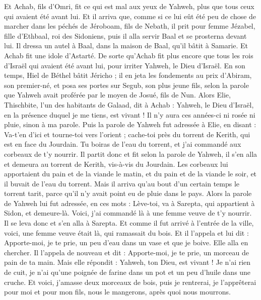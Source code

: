 \begin{multicols}{2}
Et Achab, fils d’Omri, fit ce qui est mal aux yeux de Yahweh, plus que tous ceux qui avaient été avant lui.
Et il arriva que, comme si ce lui eût été peu de chose de marcher dans les péchés de Jéroboam, fils de Nebath, il prit pour femme Jézabel, fille d'Ethbaal, roi des Sidoniens, puis il alla servir Baal et se prosterna devant lui.
Il dressa un autel à Baal, dans la maison de Baal, qu'il bâtit à Samarie.
Et Achab fit une idole d’Astarté. De sorte qu'Achab fit plus encore que tous les rois d'Israël qui avaient été avant lui, pour irriter Yahweh, le Dieu d'Israël.
En son temps, Hiel de Béthel bâtit Jéricho ; il en jeta les fondements au prix d’Abiram, son premier-né, et posa ses portes sur Segub, son plus jeune fils, selon la parole que Yahweh avait proférée par le moyen de Josué, fils de Nun.
\VerseOne{}Alors Elie, Thischbite, l’un des habitants de Galaad, dit à Achab : Yahweh, le Dieu d'Israël, en la présence duquel je me tiens, est vivant ! Il n'y aura ces années-ci ni rosée ni pluie, sinon à ma parole.
Puis la parole de Yahweh fut adressée à Elie, en disant :
Va-t'en d'ici et tourne-toi vers l'orient ; cache-toi près du torrent de Kerith, qui est en face du Jourdain.
Tu boiras de l’eau du torrent, et j'ai commandé aux corbeaux de t'y nourrir.
Il partit donc et fit selon la parole de Yahweh, il s'en alla et demeura au torrent de Kerith, vis-à-vis du Jourdain.
Les corbeaux lui apportaient du pain et de la viande le matin, et du pain et de la viande le soir, et il buvait de l’eau du torrent.
Mais il arriva qu'au bout d’un certain temps le torrent tarit, parce qu'il n'y avait point eu de pluie dans le pays.
Alors la parole de Yahweh lui fut adressée, en ces mots :
Lève-toi, va à Sarepta, qui appartient à Sidon, et demeure-là. Voici, j'ai commandé là à une femme veuve de t'y nourrir.
Il se leva donc et s'en alla à Sarepta. Et comme il fut arrivé à l’entrée de la ville, voici, une femme veuve était là, qui ramassait du bois. Et il l'appela et lui dit : Apporte-moi, je te prie, un peu d'eau dans un vase et que je boive.
Elle alla en chercher. Il l’appela de nouveau et dit : Apporte-moi, je te prie, un morceau de pain de ta main.
Mais elle répondit : Yahweh, ton Dieu, est vivant ! Je n'ai rien de cuit, je n'ai qu’une poignée de farine dans un pot et un peu d'huile dans une cruche. Et voici, j'amasse deux morceaux de bois, puis je rentrerai, je l'apprêterai pour moi et pour mon fils, nous le mangerons, après quoi nous mourrons.

\end{multicols}
